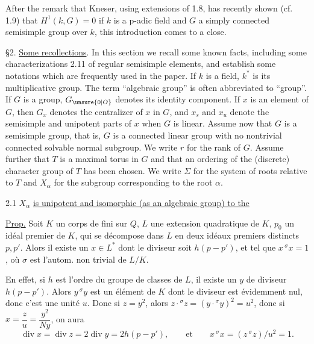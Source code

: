 After the remark that Kneser, using extensions of 1.8, has recently shown (cf. 1.9) that $H^1(k,G)=0$ if $k$ is a p-adic field and $G$ a simply connected semisimple group over $k$, this introduction comes to a close.

\S2. \uline{Some recollections}. In this section we recall some known facts, including some characterizations 2.11 of regular semisimple elements, and establish some notations which are frequently used in the paper. If $k$ is a field, $k^*$ is its multiplicative group. The term ``algebraic group'' is often abbreviated to ``group''. If $G$ is a group, $G_{\unsure{0|O}}$ denotes its identity component. If $x$ is an element of $G$, then $G_x$ denotes the centralizer of $x$ in $G$, and $x_s$ and $x_u$ denote the semisimple and unipotent parts of $x$ when $G$ is linear. Assume now that $G$ is a semisimple group, that is, $G$ is a connected linear group with no nontrivial connected solvable normal subgroup. We write $r$ for the rank of $G$. Assume further that $T$ is a maximal torus in $G$ and that an ordering of the (discrete) character group of $T$ has been chosen. We write $\Sigma$ for the system of roots relative to $T$ and $X_\alpha$ for the subgroup corresponding to the root $\alpha$.

2.1 $X_\alpha$ \uline{is unipotent and isomorphic (as an algebraic group) to the}


\uline{Prop.} Soit $K$ un corps de  fini sur $Q$, $L$ une extension quadratique de $K$, $p_0$ un idéal premier de $K$,  qui se décompose dans $L$ en deux idéaux premiers distincts $p,p'$. Alors il existe un $x\in L^*$   dont le diviseur soit $h(p-p')$,  et tel que $x\,{}^\sigma x=1$, où $\sigma$ est l'autom. non trivial de $L/K$.


En effet,  si $h$ est l'ordre du groupe de classes  de $L$, il existe un $y$ de diviseur $h(p-p')$. Alors $y\,{}^\sigma y$ est un élément de $K$ dont le diviseur est évidemment nul, donc c'est une unité $u$.
Donc si $z=y^2$, alors  $z\cdot{}^\sigma z=(y\cdot{}^\sigma y)^2=u^2$, donc si $x=\dfrac{z}{u}=\dfrac{y^2}{Ny}$, on aura
\[
\operatorname{div}x=\operatorname{div}z=2\operatorname{div}y=2h(p-p'),\qquad\text{et}\qquad x\,{}^\sigma x=(z\,{}^\sigma z)/u^2=1.
\]

